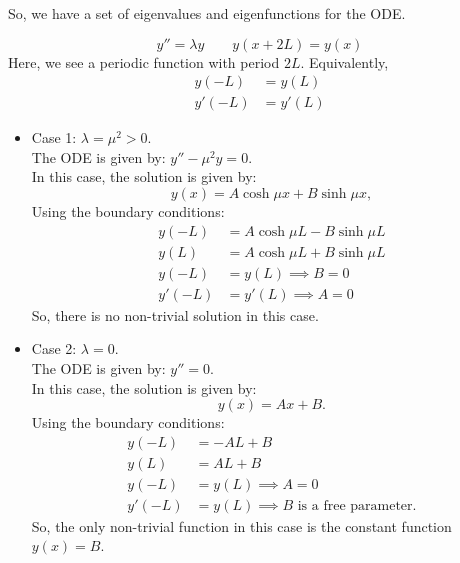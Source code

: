 \begin{eg}
	So, we have a set of eigenvalues and eigenfunctions for the ODE.
\end{eg}

\begin{eg}
	\[
	y'' = \lambda y \qquad y(x+2L) = y(x)
	\]
	Here, we see a periodic function with period $2L$. Equivalently,
	\begin{align*}
		y(-L) &= y(L) \\
		y'(-L) &= y'(L)
	\end{align*}
	\begin{itemize}
		\item Case 1: $\lambda = \mu^2 > 0$.\\
		The ODE is given by: $y'' - \mu^2 y = 0$.\\
		In this case, the solution is given by:
		\[
		y(x) = A \cosh{\mu x} + B \sinh{\mu x},
		\]
		Using the boundary conditions:
		\begin{align*}
			y(-L) &= A \cosh{\mu L} - B \sinh{\mu L} \\
			y(L) &= A \cosh{\mu L} + B \sinh{\mu L} \\
			y(-L) &= y(L) \implies B = 0 \\
			y'(-L) &= y'(L) \implies A = 0 
		\end{align*}
		So, there is no non-trivial solution in this case.
		
		\item Case 2: $\lambda = 0$.\\
		The ODE is given by: $y''= 0$.\\
		In this case, the solution is given by:
		\[
		y(x) = Ax + B.
		\]
		Using the boundary conditions:
		\begin{align*}
			y(-L) &= -AL + B\\
			y(L) &= AL + B \\
			y(-L) &= y(L) \implies A = 0 \\
			y'(-L) &= y(L) \implies B \text{ is a free parameter.}
		\end{align*}
		So, the only non-trivial function in this case is the constant function $y(x)=B$.
		

\end{itemize}
\end{eg}
